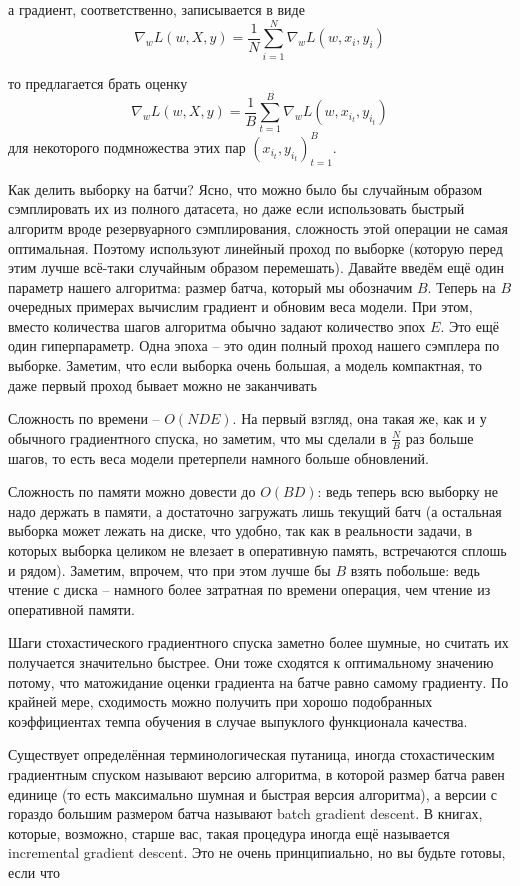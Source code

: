 а градиент, соответственно, записывается в виде
\[ \nabla_w L(w,X,y) = \frac{1}{N} \sum_{i=1}^N \nabla_w L(w,x_i,y_i) \]

то предлагается брать оценку
\[ \nabla_w L(w,X,y) = \frac{1}{B} \sum_{t=1}^B \nabla_w L(w,x_{i_t},y_{i_t}) \]
для некоторого подмножества этих пар $(x_{i_t},y_{i_t})_{t=1}^B$.

Как делить выборку на батчи?
Ясно, что можно было бы случайным образом сэмплировать их из полного датасета, но даже если использовать быстрый
алгоритм вроде резервуарного сэмплирования, сложность этой операции не самая оптимальная.
Поэтому используют линейный проход по выборке (которую перед этим лучше всё-таки случайным образом перемешать).
Давайте введём ещё один параметр нашего алгоритма: размер батча, который мы обозначим $B$.
Теперь на $B$ очередных примерах вычислим градиент и обновим веса модели.
При этом, вместо количества шагов алгоритма обычно задают количество эпох $E$.
Это ещё один гиперпараметр.
Одна эпоха -- это один полный проход нашего сэмплера по выборке.
Заметим, что если выборка очень большая, а модель компактная, то даже первый проход бывает можно не заканчивать

Сложность по времени -- $O(NDE)$.
На первый взгляд, она такая же, как и у обычного градиентного спуска, но заметим, что мы сделали в $\frac{N}{B}$
раз больше шагов, то есть веса модели претерпели намного больше обновлений.

Сложность по памяти можно довести до $O(BD)$: ведь теперь всю выборку не надо держать в памяти, а достаточно
загружать лишь текущий батч (а остальная выборка может лежать на диске, что удобно, так как в реальности задачи, в
которых выборка целиком не влезает в оперативную память, встречаются сплошь и рядом).
Заметим, впрочем, что при этом лучше бы $B$ взять побольше: ведь чтение с диска -- намного более затратная по
времени операция, чем чтение из оперативной памяти.

Шаги стохастического градиентного спуска заметно более шумные, но считать их получается значительно быстрее.
Они тоже сходятся к оптимальному значению потому, что матожидание оценки градиента на батче равно самому градиенту.
По крайней мере, сходимость можно получить при хорошо подобранных коэффициентах темпа обучения в случае выпуклого
функционала качества.

Существует определённая терминологическая путаница, иногда стохастическим градиентным спуском называют версию
алгоритма, в которой размер батча равен единице (то есть максимально шумная и быстрая версия алгоритма), а версии с
гораздо большим размером батча называют batch gradient descent.
В книгах, которые, возможно, старше вас, такая процедура иногда ещё называется incremental gradient descent.
Это не очень принципиально, но вы будьте готовы, если что